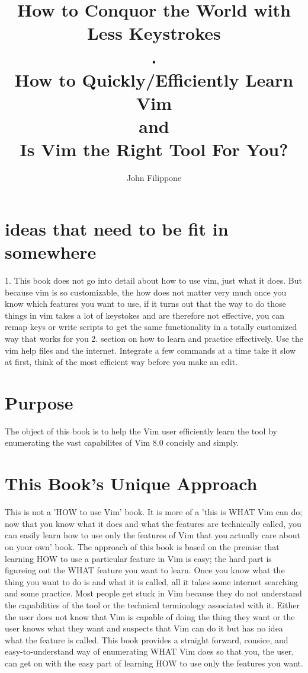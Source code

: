 \documentclass[12pt]{book}
\title{How to Conquor the World with Less Keystrokes \\.\\\large How to Quickly/Efficiently Learn Vim \\\large and \\\large Is Vim the Right Tool For You?}
\author{John Filippone}
\begin{document}
\maketitle

\section{ideas that need to be fit in somewhere}
1. This book does not go into detail about how to use vim, just what it does.  
But because vim is so customizable, the how does not matter very much
once you know which features you want to use, if it turns out that the way to do those things in vim takes a lot of keystokes and are therefore
not effective, you can remap keys or write scripts to get the same functionality in a totally customized way that works for you
2. section on how to learn and practice effectively.
Use the vim help files and the internet.
Integrate a few commands at a time take it slow at first, think of the most efficient way before you make an edit.

\section{Purpose}
The object of this book is to help the Vim user efficiently learn the tool by enumerating the vast capabilites of Vim 8.0 concisly and simply.  

\section{This Book's Unique Approach}
This is not a 'HOW to use Vim' book. 
It is more of a 'this is WHAT Vim can do; now that you know what it does and what the features are technically called, you can easily learn how to use only the features of Vim 
that you actually care about on your own' book. 
The approach of this book is based on the premise that learning HOW to use a particular feature in Vim is easy; the hard part is figureing out the WHAT feature you want to learn.  
Once you know what the thing you want to do is and what it is called, all it takes some internet searching and some practice.  
Most people get stuck in Vim because they do not understand the capabilities of the tool or the technical terminology associated with it.
Either the user does not know that Vim is capable of doing the thing they want or the user knows what they want and suspects that Vim can do it but has no idea what the feature is called.
This book provides a straight forward, consice, and easy-to-understand way of enumerating WHAT Vim does so that you, the user, can get on with the easy part of learning HOW to use only the
features you want.  
 
\end{document}
